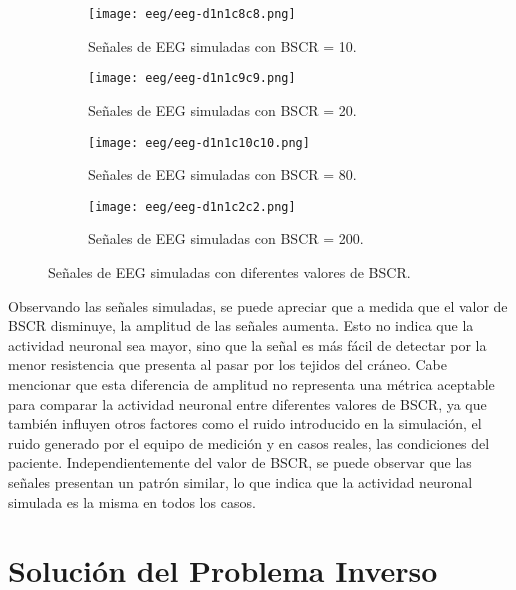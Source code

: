 \begin{figure}[tbp]
    \centering
    \begin{subfigure}{0.9\textwidth}
        \texttt{[image: eeg/eeg-d1n1c8c8.png]}
        \caption{Señales de EEG simuladas con BSCR = 10.}
        \label{fig:eeg-d1n1c8c8}
        \vspace{0.5em}
    \end{subfigure}
    \vfill
    \begin{subfigure}{0.9\textwidth}
        \texttt{[image: eeg/eeg-d1n1c9c9.png]}
        \caption{Señales de EEG simuladas con BSCR = 20.}
        \label{fig:eeg-d1n1c9c9}
        \vspace{0.5em}
    \end{subfigure}
    \vfill
    \begin{subfigure}{0.9\textwidth}
        \texttt{[image: eeg/eeg-d1n1c10c10.png]}
        \caption{Señales de EEG simuladas con BSCR = 80.}
        \label{fig:eeg-d1n1c10c10}
        \vspace{0.5em}
    \end{subfigure}
    \vfill
    \begin{subfigure}{0.9\textwidth}
        \texttt{[image: eeg/eeg-d1n1c2c2.png]}
        \caption{Señales de EEG simuladas con BSCR = 200.}
        \label{fig:eeg-d1n1c2c2}
    \end{subfigure}
    \caption{Señales de EEG simuladas con diferentes valores de BSCR.}
    \label{fig:eeg-simulated}
\end{figure}

Observando las señales simuladas, se puede apreciar que a medida que el valor de BSCR disminuye, la amplitud de las señales aumenta. 
Esto no indica que la actividad neuronal sea mayor, sino que la señal es más fácil de detectar por la menor resistencia que presenta al pasar por los tejidos del cráneo.
Cabe mencionar que esta diferencia de amplitud no representa una métrica aceptable para comparar la actividad neuronal entre diferentes valores de BSCR, ya que también influyen otros factores como el ruido introducido en la simulación, el ruido generado por el equipo de medición y en casos reales, las condiciones del paciente.
Independientemente del valor de BSCR, se puede observar que las señales presentan un patrón similar, lo que indica que la actividad neuronal simulada es la misma en todos los casos.

\section{Solución del Problema Inverso}
\label{sec:results:inverse}

